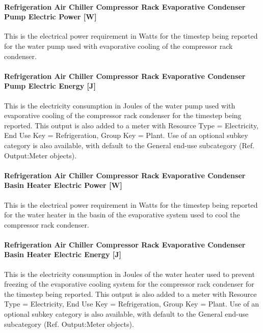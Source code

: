 \paragraph{Refrigeration Air Chiller Compressor Rack Evaporative Condenser Pump Electric Power {[}W{]}}\label{refrigeration-air-chiller-compressor-rack-evaporative-condenser-pump-electric-power-w}

This is the electrical power requirement in Watts for the timestep being reported for the water pump used with evaporative cooling of the compressor rack condenser.

\paragraph{Refrigeration Air Chiller Compressor Rack Evaporative Condenser Pump Electric Energy {[}J{]}}\label{refrigeration-air-chiller-compressor-rack-evaporative-condenser-pump-electric-energy-j}

This is the electricity consumption in Joules of the water pump used with evaporative cooling of the compressor rack condenser for the timestep being reported. This output is also added to a meter with Resource Type = Electricity, End Use Key = Refrigeration, Group Key = Plant. Use of an optional subkey category is also available, with default to the General end-use subcategory (Ref. Output:Meter objects).

\paragraph{Refrigeration Air Chiller Compressor Rack Evaporative Condenser Basin Heater Electric Power {[}W{]}}\label{refrigeration-air-chiller-compressor-rack-evaporative-condenser-basin-heater-electric-power-w}

This is the electrical power requirement in Watts for the timestep being reported for the water heater in the basin of the evaporative system used to cool the compressor rack condenser.

\paragraph{Refrigeration Air Chiller Compressor Rack Evaporative Condenser Basin Heater Electric Energy {[}J{]}}\label{refrigeration-air-chiller-compressor-rack-evaporative-condenser-basin-heater-electric-energy-j}

This is the electricity consumption in Joules of the water heater used to prevent freezing of the evaporative cooling system for the compressor rack condenser for the timestep being reported. This output is also added to a meter with Resource Type = Electricity, End Use Key = Refrigeration, Group Key = Plant. Use of an optional subkey category is also available, with default to the General end-use subcategory (Ref. Output:Meter objects).

